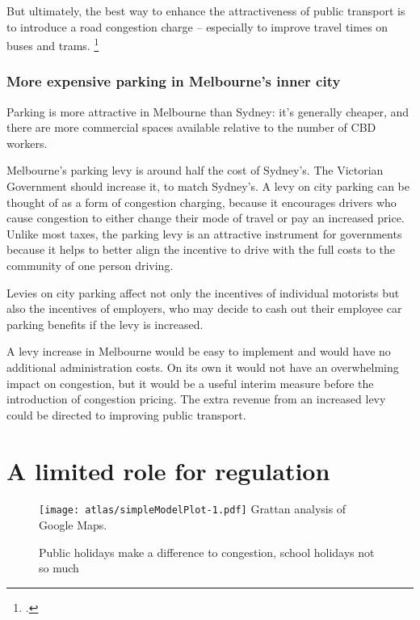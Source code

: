 \documentclass{grattan}
\begin{document}
But ultimately, the best way to enhance the attractiveness of public transport is to introduce a road congestion charge -- especially to improve travel times on buses and trams.%
    \footcite{Urbanist-2011-Do-governments-spend-too-much-on-roads}

\subsubsection{More expensive parking in Melbourne's inner city}
Parking is more attractive in Melbourne than Sydney: it's generally cheaper, and there are more commercial spaces available relative to the number of CBD workers.

Melbourne's parking levy is around half the cost of Sydney's.
The Victorian Government should increase it, to match Sydney's.
A levy on city parking can be thought of as a form of congestion charging, because it encourages drivers who cause congestion to either change their mode of travel or pay an increased price.
Unlike most taxes, the parking levy is an attractive instrument for governments because it helps to better align the incentive to drive with the full costs to the community of one person driving.

Levies on city parking affect not only the incentives of individual motorists but also the incentives of employers, who may decide to cash out their employee car parking benefits if the levy is increased.

A levy increase in Melbourne would be easy to implement and would have no additional administration costs.
On its own it would not have an overwhelming impact on congestion, but it would be a useful interim measure before the introduction of congestion pricing.
The extra revenue from an increased levy could be directed to improving public transport.


\section{A limited role for regulation}\label{sec:Regulations}

\begin{figure}[p]
\caption{Public holidays make a difference to congestion, school holidays not so much}\label{fig:congestion-school-holidays}
\texttt{[image: atlas/simpleModelPlot-1.pdf]}
%
{Grattan analysis of Google Maps.}
\end{figure}
\end{document}
